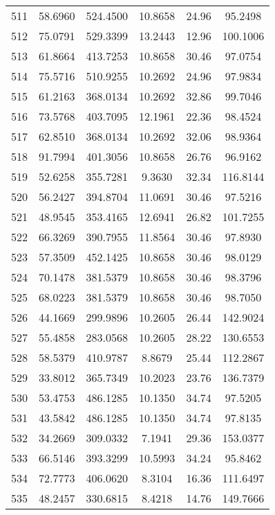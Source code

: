\begin{center}
\begin{footnotesize}
\begin{tabular}{|c|ccccc|}
511 & 58.6960 & 524.4500 & 10.8658 & 24.96 & 95.2498 \\
512 & 75.0791 & 529.3399 & 13.2443 & 12.96 & 100.1006 \\
513 & 61.8664 & 413.7253 & 10.8658 & 30.46 & 97.0754 \\
514 & 75.5716 & 510.9255 & 10.2692 & 24.96 & 97.9834 \\
515 & 61.2163 & 368.0134 & 10.2692 & 32.86 & 99.7046 \\
516 & 73.5768 & 403.7095 & 12.1961 & 22.36 & 98.4524 \\
517 & 62.8510 & 368.0134 & 10.2692 & 32.06 & 98.9364 \\
518 & 91.7994 & 401.3056 & 10.8658 & 26.76 & 96.9162 \\
519 & 52.6258 & 355.7281 & 9.3630 & 32.34 & 116.8144 \\
520 & 56.2427 & 394.8704 & 11.0691 & 30.46 & 97.5216 \\
521 & 48.9545 & 353.4165 & 12.6941 & 26.82 & 101.7255 \\
522 & 66.3269 & 390.7955 & 11.8564 & 30.46 & 97.8930 \\
523 & 57.3509 & 452.1425 & 10.8658 & 30.46 & 98.0129 \\
524 & 70.1478 & 381.5379 & 10.8658 & 30.46 & 98.3796 \\
525 & 68.0223 & 381.5379 & 10.8658 & 30.46 & 98.7050 \\
526 & 44.1669 & 299.9896 & 10.2605 & 26.44 & 142.9024 \\
527 & 55.4858 & 283.0568 & 10.2605 & 28.22 & 130.6553 \\
528 & 58.5379 & 410.9787 & 8.8679 & 25.44 & 112.2867 \\
529 & 33.8012 & 365.7349 & 10.2023 & 23.76 & 136.7379 \\
530 & 53.4753 & 486.1285 & 10.1350 & 34.74 & 97.5205 \\
531 & 43.5842 & 486.1285 & 10.1350 & 34.74 & 97.8135 \\
532 & 34.2669 & 309.0332 & 7.1941 & 29.36 & 153.0377 \\
533 & 66.5146 & 393.3299 & 10.5993 & 34.24 & 95.8462 \\
534 & 72.7773 & 406.0620 & 8.3104 & 16.36 & 111.6497 \\
535 & 48.2457 & 330.6815 & 8.4218 & 14.76 & 149.7666 \\
\hline
\end{tabular}
\end{footnotesize}
\end{center}

